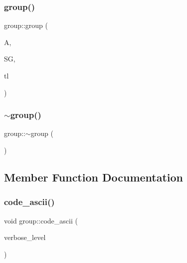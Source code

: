 \subsubsection{\texorpdfstring{group()}{group()}\hspace{0.1cm}{\footnotesize\ttfamily [4/4]}}
{\footnotesize\ttfamily group\+::group (\begin{DoxyParamCaption}\item[{\mbox{\hyperlink{classaction}{action}} $\ast$}]{A,  }\item[{\mbox{\hyperlink{classvector__ge}{vector\+\_\+ge}} \&}]{SG,  }\item[{\mbox{\hyperlink{galois_8h_a09fddde158a3a20bd2dcadb609de11dc}{I\+NT}} $\ast$}]{tl }\end{DoxyParamCaption})}

\mbox{\label{classgroup_a1004fae3de56db559882f3e77623f844}} 
\subsubsection{\texorpdfstring{$\sim$group()}{~group()}}
{\footnotesize\ttfamily group\+::$\sim$group (\begin{DoxyParamCaption}{ }\end{DoxyParamCaption})}



\subsection{Member Function Documentation}
\mbox{\label{classgroup_abb93ebcd087d3f1146f32c2b5203f913}} 
\subsubsection{\texorpdfstring{code\+\_\+ascii()}{code\_ascii()}}
{\footnotesize\ttfamily void group\+::code\+\_\+ascii (\begin{DoxyParamCaption}\item[{\mbox{\hyperlink{galois_8h_a09fddde158a3a20bd2dcadb609de11dc}{I\+NT}}}]{verbose\+\_\+level }\end{DoxyParamCaption})}

\mbox{\label{classgroup_aaf998199131855804b53c8fc917a187f}} 
